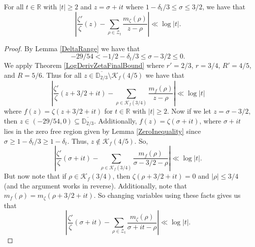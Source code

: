 \begin{theorem}[SumBoundII]
\label{SumBoundII}
\leanok
For all $t\in\mathbb{R}$ with $|t|\geq 2$ and $z=\sigma+it$
    where $1-\delta_t/3\leq\sigma\leq 3/2$, we have that
    $$\left|\frac{\zeta'}{\zeta}(z)
      -\sum_{\rho\in\mathcal{Z}_t}\frac{m_\zeta(\rho)}{z-\rho}\right|\ll\log|t|.$$
\end{theorem}
\begin{proof}
\leanok
By Lemma \ref{DeltaRange} we have that
    $$-29/54<-1/2-\delta_t/3\leq\sigma-3/2\leq0.$$
    We apply Theorem \ref{LogDerivZetaFinalBound} where $r'=2/3$, $r=3/4$, $R'=4/5$, and $R=5/6$.
    Thus for all $z\in\overline{\mathbb{D}_{2/3}}\setminus\mathcal{K}_f(4/5)$ we have that
    $$\left|\frac{\zeta'}{\zeta}(z+3/2+it)
      -\sum_{\rho\in\mathcal{K}_f(3/4)}\frac{m_f(\rho)}{z-\rho}\right|\ll\log|t|$$
    where $f(z)=\zeta(z+3/2+it)$ for $t\in\mathbb{R}$ with $|t|\geq 2$.
    Now if we let $z=\sigma-3/2$, then $z\in(-29/54,0)\subseteq\overline{\mathbb{D}_{2/3}}$.
    Additionally, $f(z)=\zeta(\sigma+it)$, where $\sigma+it$ lies in the zero free region given by
    Lemma \ref{ZeroInequality} since $\sigma\geq 1-\delta_t/3\geq 1-\delta_t$.
    Thus, $z\not\in\mathcal{K}_f(4/5)$. So,
    $$\left|\frac{\zeta'}{\zeta}(\sigma+it)
      -\sum_{\rho\in\mathcal{K}_f(3/4)}\frac{m_f(\rho)}{\sigma-3/2-\rho}\right|\ll\log|t|.$$
    But now note that if $\rho\in\mathcal{K}_f(3/4)$, then $\zeta(\rho+3/2+it)=0$
    and $|\rho|\leq 3/4$ (and the argument works in reverse). Additionally, note that
    $m_f(\rho)=m_\zeta(\rho+3/2+it)$. So changing variables using these facts gives us that
    $$\left|\frac{\zeta'}{\zeta}(\sigma+it)
      -\sum_{\rho\in\mathcal{Z}_t}\frac{m_\zeta(\rho)}{\sigma+it-\rho}\right|\ll\log|t|.$$
\end{proof}
